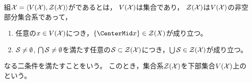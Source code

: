 \begin{definition}
    組\( \ConnectivitySpace = \OrderedSet<\VFunctor(\ConnectivitySpace), \ConnectivityStructure(\ConnectivitySpace)>\)が\WordConnectivitySpace であるとは，
    \(\VFunctor(\ConnectivitySpace)\)は集合であり，
    \(\ConnectivityStructure(\ConnectivitySpace)\)は\(\VFunctor(\ConnectivitySpace)\)の非空部分集合系であって，
    \begin{enumerate}
        \item 任意の\( \Element\in\VFunctor(\ConnectivitySpace) \)につき，\( \Set{\Element}\in\ConnectivityStructure(X) \)が成り立つ。
        \item \( \Set<\mathcal{S}>\not=\emptyset \), \( \bigcap\Set<\mathcal{S}>\not=\emptyset \)を満たす任意の\( \Set<\mathcal{S}>\subset\ConnectivityStructure(\ConnectivitySpace) \)につき，\( \bigcup\Set<\mathcal{S}>\in\ConnectivityStructure(\ConnectivitySpace) \)が成り立つ。
    \end{enumerate}
    なる二条件を満たすことをいう。
    このとき，集合系\( \ConnectivityStructure(\ConnectivitySpace) \)を下部集合\( \VFunctor(\ConnectivitySpace) \)上の\WordConnectivityStructure という。

\end{definition}
